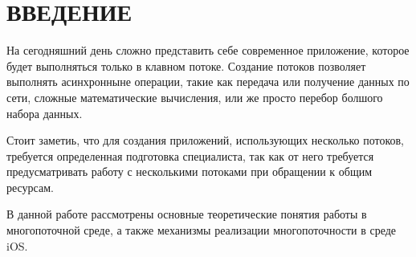 \section*{ВВЕДЕНИЕ}

На сегодняшний день сложно представить себе современное приложение, которое
будет выполняться только в клавном потоке. Создание потоков позволяет выполнять
асинхронныне операции, такие как передача или получение данных по сети,
сложные математические вычисления, или же просто перебор болшого набора данных.

Стоит заметиь, что для создания приложений, использующих несколько потоков,
требуется определенная подготовка специалиста, так как от него требуется
предусматривать работу с несколькими потоками при обращении к общим ресурсам.

В данной работе рассмотрены основные теоретические понятия работы в
многопоточной среде, а также механизмы реализации многопоточности в среде iOS.

\pagebreak
